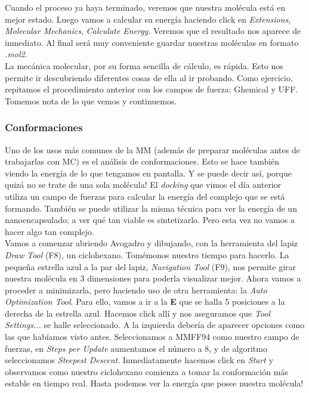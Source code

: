 \documentclass[10pt,letterpaper]{article}
\begin{document}
Cuando el proceso ya haya terminado, veremos que nuestra mol\'ecula est\'a en mejor estado. Luego vamos a calcular su energ\'ia haciendo click en \emph{Extensions}, \emph{Molecular Mechanics}, \emph{Calculate Energy}. Veremos que el resultado nos aparece de inmediato. Al final ser\'a muy conveniente guardar nuestras mol\'eculas en formato \emph{.mol2}.\\

La mec\'anica molecular, por su forma sencilla de c\'alculo, es r\'apida. Esto nos permite ir descubriendo diferentes cosas de ella al ir probando. Como ejercicio, repitamos el procedimiento anterior con los campos de fuerza: Ghemical y UFF. Tomemos nota de lo que vemos y continuemos.

\subsubsection{Conformaciones}
Uno de los usos m\'as comunes de la MM (adem\'as de preparar mol\'eculas antes de trabajarlas con MC) es el an\'alisis de conformaciones. Esto se hace tambi\'en viendo la energ\'ia de lo que tengamos en pantalla. Y se puede decir as\'i, porque quiz\'a no se trate de una sola mol\'ecula! El \emph{docking} que vimos el d\'ia anterior utiliza un campo de fuerzas para calcular la energ\'ia del complejo que se est\'a formando. Tambi\'en se puede utilizar la misma t\'ecnica para ver la energ\'ia de un nanoencapsulado; a ver qu\'e tan viable es sintetizarlo. Pero esta vez no vamos a hacer algo tan complejo.\\

Vamos a comenzar abriendo Avogadro y dibujando, con la herramienta del lapiz \emph{Draw Tool} (F8), un ciclohexano. Tom\'emonos nuestro tiempo para hacerlo. La peque\~na estrella azul a la par del lapiz, \emph{Navigation Tool} (F9), nos permite girar nuestra mol\'ecula en 3 dimensiones para poderla visualizar mejor. Ahora vamos a proceder a minimizarla, pero haciendo uso de otra herramienta: la \emph{Auto Optimization Tool}. Para ello, vamos a ir a la \textbf{E} que se halla 5 posiciones a la derecha de la estrella azul. Hacemos click all\'i y nos aseguramos que \emph{Tool Settings...} se halle seleccionado. A la izquierda deber\'ia de aparecer opciones como las que hab\'iamos visto antes. Seleccionamos a MMFF94 como nuestro campo de fuerzas, en \emph{Steps per Update} aumentamos el n\'umero a 8, y de algoritmo seleccionamos \emph{Steepest Descent}. Inmediatamente hacemos click en \emph{Start} y observamos como nuestro ciclohexano comienza a tomar la conformaci\'on m\'as estable en tiempo real. Hasta podemos ver la energ\'ia que posee nuestra mol\'ecula!\\
\end{document}
